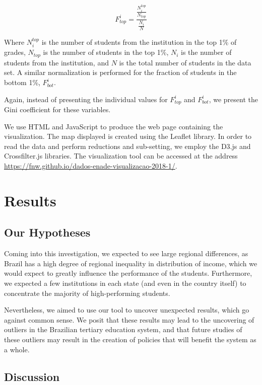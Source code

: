 \documentclass{vgtc}                          %
\begin{document}
\begin{equation}\label{eq:ftopinst}
F_{top}^{i} = \frac{\frac{N_{i}^{top}}{N_{top}}}{\frac{N_{i}}{N}}
\end{equation}

Where $N_{i}^{top}$ is the number of students from the institution in the top 1\% of grades, $N_{top}$ is the number of students in the top 1\%, $N_{i}$ is the number of students from the institution, and $N$ is the total number of students in the data set. A similar normalization is performed for the fraction of students in the bottom 1\%, $F_{bot}^{i}$.

Again, instead of presenting the individual values for $F_{top}^{i}$ and $F_{bot}^{i}$, we present the Gini coefficient for these variables.


We use HTML and JavaScript to produce the web page containing the visualization. The map displayed is created using the Leaflet library. In order to read the data and perform reductions and sub-setting, we employ the D3.js and Crossfilter.js libraries. The visualization tool can be accessed at the address \url{https://fnw.github.io/dados-enade-visualizacao-2018-1/}.


\section{Results}

\subsection{Our Hypotheses}
Coming into this investigation, we expected to see large regional differences, as Brazil has a high degree of regional inequality in distribution of income, which we would expect to greatly influence the performance of the students. Furthermore, we expected a few institutions in each state (and even in the country itself) to concentrate the majority of high-performing students.

Nevertheless, we aimed to use our tool to uncover unexpected results, which go against common sense. We posit that these results may lead to the uncovering of outliers in the Brazilian tertiary education system, and that future studies of these outliers may result in the creation of policies that will benefit the system as a whole.

\subsection{Discussion}
\end{document}
